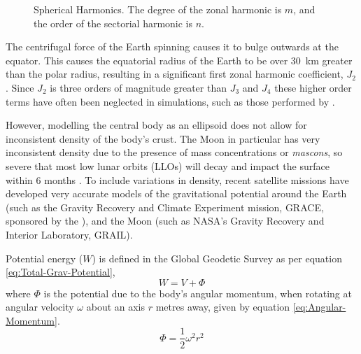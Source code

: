 \begin{figure}
\centering
\def\svgwidth{0.6\textwidth}

\caption{Spherical Harmonics. The degree of the zonal harmonic is $m$, and the order of the sectorial harmonic is $n$. %
} \label{fig:Spherical-Harmonics}
\end{figure}

The centrifugal force of the Earth spinning causes it to bulge outwards at the equator. This causes the equatorial radius of the Earth to be over 30~km greater than the polar radius, resulting in a significant first zonal harmonic coefficient, $J_{2}$. Since $J_{2}$ is three orders of magnitude greater than $J_{3}$ and $J_{4}$ these higher order terms have often been neglected in simulations, such as those performed by \textcite{Yang2007}.

However, modelling the central body as an ellipsoid does not allow for inconsistent density of the body's crust. The Moon in particular has very inconsistent density due to the presence of mass concentrations or \emph{mascons}, so severe that most low lunar orbits (LLOs) will decay and impact the surface within 6 months \parencite{Zeile2010}. To include variations in density, recent satellite missions have developed very accurate models of the gravitational potential around the Earth (such as the Gravity Recovery and Climate Experiment mission, GRACE, sponsored by the \cite{EIGEN-5C}), and the Moon (such as NASA's Gravity Recovery and Interior Laboratory, GRAIL).

Potential energy ($W$) is defined in the Global Geodetic Survey \parencite{WGS84} as per equation \eqref{eq:Total-Grav-Potential},
\begin{equation}\label{eq:Total-Grav-Potential}
W=V+\Phi
\end{equation}
where $\Phi$ is the potential due to the body's angular momentum, when rotating at angular velocity $\omega$ about an axis $r$ metres away, given by equation \eqref{eq:Angular-Momentum}.
\begin{equation}\label{eq:Angular-Momentum}
\Phi=\frac{1}{2}\omega^{2}r^{2}
\end{equation}

